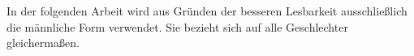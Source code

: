 In der folgenden Arbeit wird aus Gründen der besseren Lesbarkeit ausschließlich die männliche Form verwendet. Sie bezieht sich auf alle Geschlechter gleichermaßen.
\newpage